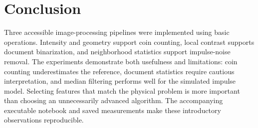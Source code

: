 \documentclass[conference]{IEEEtran}
\begin{document}
\section{Conclusion}
Three accessible image-processing pipelines were implemented using basic operations. Intensity and geometry support coin counting, local contrast supports document binarization, and neighborhood statistics support impulse-noise removal. The experiments demonstrate both usefulness and limitations: coin counting underestimates the reference, document statistics require cautious interpretation, and median filtering performs well for the simulated impulse model. Selecting features that match the physical problem is more important than choosing an unnecessarily advanced algorithm. The accompanying executable notebook and saved measurements make these introductory observations reproducible.



\end{document}
